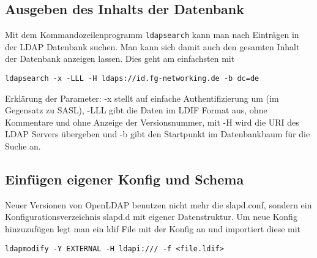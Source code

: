 \documentclass[11pt,a4paper,titlepage=firstiscover]{scrartcl} %
\begin{document}
\subsection{Ausgeben des Inhalts der Datenbank}
Mit dem Kommandozeilenprogramm \texttt{ldapsearch} kann man nach Einträgen in der LDAP Datenbank suchen. Man kann sich damit auch den gesamten Inhalt der Datenbank anzeigen lassen. Dies geht am einfachsten mit
\begin{lstlisting}
ldapsearch -x -LLL -H ldaps://id.fg-networking.de -b dc=de
\end{lstlisting}
Erklärung der Parameter: -x stellt auf einfache Authentifizierung um (im Gegensatz zu SASL), -LLL gibt die Daten im LDIF Format aus, ohne Kommentare und ohne Anzeige der Versionsnummer, mit -H wird die URI des LDAP Servers übergeben und -b gibt den Startpunkt im Datenbankbaum für die Suche an.


\subsection{Einfügen eigener Konfig und Schema}
Neuer Versionen von OpenLDAP benutzen nicht mehr die slapd.conf, sondern ein Konfigurationsverzeichnis slapd.d mit eigener Datenstruktur.
Um neue Konfig hinzuzufügen legt man ein ldif File mit der Konfig an und importiert diese mit
\begin{lstlisting}
ldapmodify -Y EXTERNAL -H ldapi:/// -f <file.ldif> 
\end{lstlisting}
\end{document}
